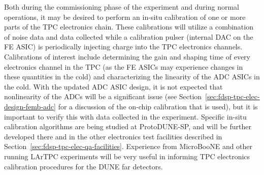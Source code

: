Both during the commissioning phase of the experiment and during normal operations, it may
be desired to perform an in-situ calibration of one or more parts of the TPC electronics chain.
These calibrations will utilize a combination of noise data and data collected while a
calibration pulser (internal DAC on the FE ASIC) is periodically injecting charge into the TPC
electronics channels.  Calibrations of interest include determining the gain and shaping time of
every electronics channel in the TPC (as the FE ASICs may experience changes in these quantities
in the cold) and characterizing the linearity of the ADC ASICs in the cold.  With the updated ADC ASIC
design, it is not expected that nonlinearity of the ADCs will be a significant issue (see
Section~\ref{sec:fdsp-tpc-elec-design-femb-adc} for a discussion of the on-chip calibration
that is used), but it is important to verify this with data collected in the experiment.
Specific in-situ calibration algorithms are being studied at ProtoDUNE-SP, and will be further
developed there and in the other electronics test facilities described in
Section~\ref{sec:fdsp-tpc-elec-qa-facilities}.  Experience from MicroBooNE and other running
LArTPC experiments will be very useful in informing TPC electronics calibration procedures for
the DUNE far detectors.
